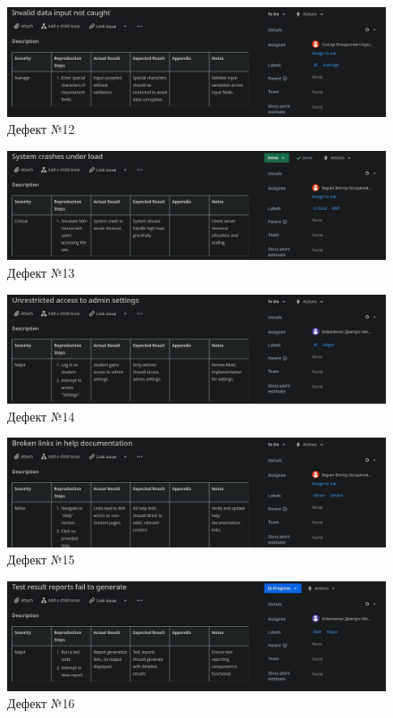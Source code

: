 \documentclass[oneside,14pt]{extarticle}
\begin{document}
\begin{normalsize}
	\begin{figure}[H]
		\centering
		\includegraphics[width=\columnwidth]{13}
		\caption{Дефект №12}
	\end{figure}
	
	\begin{figure}[H]
		\centering
		\includegraphics[width=\columnwidth]{14}
		\caption{Дефект №13}
	\end{figure}
	
	\begin{figure}[H]
		\centering
		\includegraphics[width=\columnwidth]{15}
		\caption{Дефект №14}
	\end{figure}
	
	\begin{figure}[H]
		\centering
		\includegraphics[width=\columnwidth]{16}
		\caption{Дефект №15}
	\end{figure}
	
	\begin{figure}[H]
		\centering
		\includegraphics[width=\columnwidth]{17}
		\caption{Дефект №16}
	\end{figure}
	

\end{normalsize}
\end{document}
